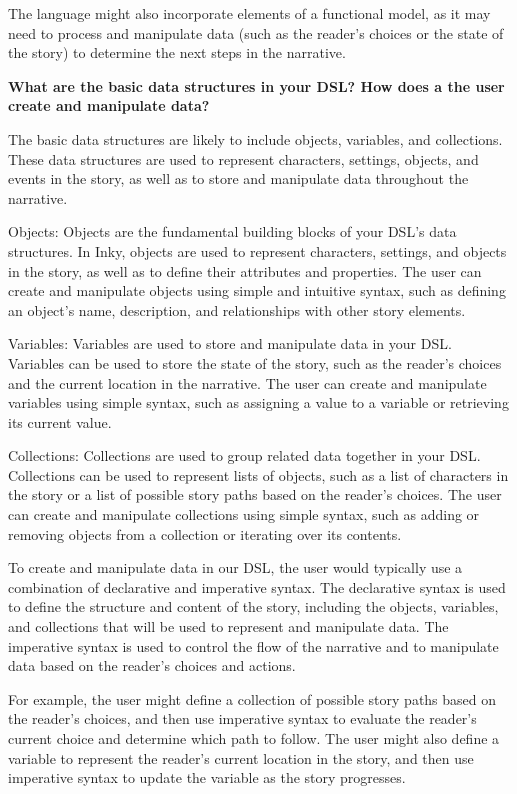 The language might also incorporate elements of a functional model, as it may need to process and manipulate data (such as the reader's choices or the state of the story) to determine the next steps in the narrative.

\textbf {What are the basic data structures in your DSL? How does a the user create and manipulate data?}

The basic data structures are likely to include objects, variables, and collections. These data structures are used to represent characters, settings, objects, and events in the story, as well as to store and manipulate data throughout the narrative.

Objects: Objects are the fundamental building blocks of your DSL's data structures. In Inky, objects are used to represent characters, settings, and objects in the story, as well as to define their attributes and properties. The user can create and manipulate objects using simple and intuitive syntax, such as defining an object's name, description, and relationships with other story elements.

Variables: Variables are used to store and manipulate data in your DSL. Variables can be used to store the state of the story, such as the reader's choices and the current location in the narrative. The user can create and manipulate variables using simple syntax, such as assigning a value to a variable or retrieving its current value.

Collections: Collections are used to group related data together in your DSL. Collections can be used to represent lists of objects, such as a list of characters in the story or a list of possible story paths based on the reader's choices. The user can create and manipulate collections using simple syntax, such as adding or removing objects from a collection or iterating over its contents.

To create and manipulate data in our DSL, the user would typically use a combination of declarative and imperative syntax. The declarative syntax is used to define the structure and content of the story, including the objects, variables, and collections that will be used to represent and manipulate data. The imperative syntax is used to control the flow of the narrative and to manipulate data based on the reader's choices and actions.

For example, the user might define a collection of possible story paths based on the reader's choices, and then use imperative syntax to evaluate the reader's current choice and determine which path to follow. The user might also define a variable to represent the reader's current location in the story, and then use imperative syntax to update the variable as the story progresses.

